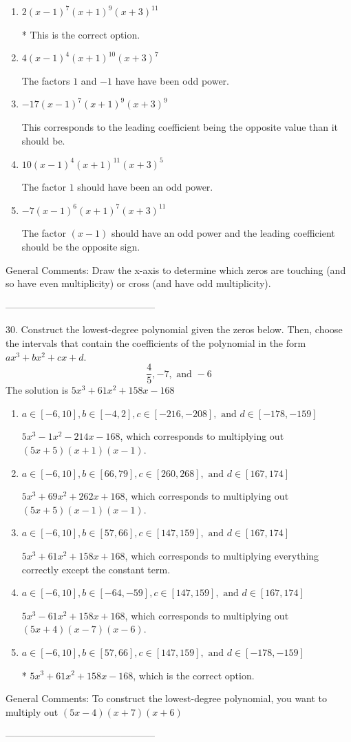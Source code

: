 \documentclass{article}[14pt]
\begin{document}
\begin{enumerate}[label=\Alph*.] 
\item $ 2(x - 1)^{7} (x + 1)^{9} (x + 3)^{11} $ 

 * This is the correct option. 
\item $ 4(x - 1)^{4} (x + 1)^{10} (x + 3)^{7} $ 

 The factors $1$ and $-1$ have have been odd power. 
\item $ -17(x - 1)^{7} (x + 1)^{9} (x + 3)^{9} $ 

 This corresponds to the leading coefficient being the opposite value than it should be. 
\item $ 10(x - 1)^{4} (x + 1)^{11} (x + 3)^{5} $ 

 The factor $1$ should have been an odd power. 
\item $ -7(x - 1)^{6} (x + 1)^{7} (x + 3)^{11} $ 

 The factor $(x - 1)$ should have an odd power and the leading coefficient should be the opposite sign. 
\end{enumerate} 
 
General Comments: Draw the x-axis to determine which zeros are touching (and so have even multiplicity) or cross (and have odd multiplicity).

-----------------------------------------------

30. Construct the lowest-degree polynomial given the zeros below. Then, choose the intervals that contain the coefficients of the polynomial in the form $ax^3+bx^2+cx+d$.
$$ \frac{4}{5}, -7, \text{ and } -6 $$ 
The solution is $ 5x^{3} +61 x^{2} +158 x -168 $ 

\begin{enumerate}[label=\Alph*.] 
\item $ a \in [-6, 10], b \in [-4, 2], c \in [-216, -208], \text{ and } d \in [-178, -159] $ 

 $5x^{3} -1 x^{2} -214 x -168$, which corresponds to multiplying out $(5x + 5)(x + 1)(x -1)$. 
\item $ a \in [-6, 10], b \in [66, 79], c \in [260, 268], \text{ and } d \in [167, 174] $ 

 $5x^{3} +69 x^{2} +262 x + 168$, which corresponds to multiplying out $(5x + 5)(x -1)(x -1)$. 
\item $ a \in [-6, 10], b \in [57, 66], c \in [147, 159], \text{ and } d \in [167, 174] $ 

 $5x^{3} +61 x^{2} +158 x + 168$, which corresponds to multiplying everything correctly except the constant term. 
\item $ a \in [-6, 10], b \in [-64, -59], c \in [147, 159], \text{ and } d \in [167, 174] $ 

 $5x^{3} -61 x^{2} +158 x + 168$, which corresponds to multiplying out $(5x + 4)(x -7)(x -6)$. 
\item $ a \in [-6, 10], b \in [57, 66], c \in [147, 159], \text{ and } d \in [-178, -159] $ 

 * $5x^{3} +61 x^{2} +158 x -168$, which is the correct option. 
\end{enumerate} 
 
General Comments: To construct the lowest-degree polynomial, you want to multiply out $(5x -4)(x + 7)(x + 6)$

-----------------------------------------------
\end{document}
